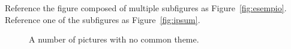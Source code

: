 \documentclass[
10pt, %
a4paper, %
oneside, %
headinclude,footinclude, %
BCOR5mm, %
]{scrartcl}
\begin{document}
Reference the figure composed of multiple subfigures as Figure~\vref{fig:esempio}. Reference one of the subfigures as Figure~\vref{fig:ipsum}. %

\lipsum[15-18] %

\begin{figure}[tb]
\centering
\caption[A number of pictures.]{A number of pictures with no common theme.} %
\label{fig:esempio}
\end{figure}


\renewcommand{\refname}{\spacedlowsmallcaps{References}} %




\end{document}
